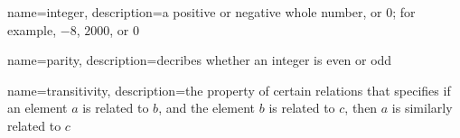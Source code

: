 {
  name=integer,
  description={a positive or negative whole number, or $0$; for example, $-8$,
  $2000$, or $0$}
}

{
  name=parity,
  description={decribes whether an integer is even or odd}
}

{
  name=transitivity,
  description={the property of certain relations that specifies if an element
  $a$ is related to $b$, and the element $b$ is related to $c$, then $a$ is
  similarly related to $c$}
}
